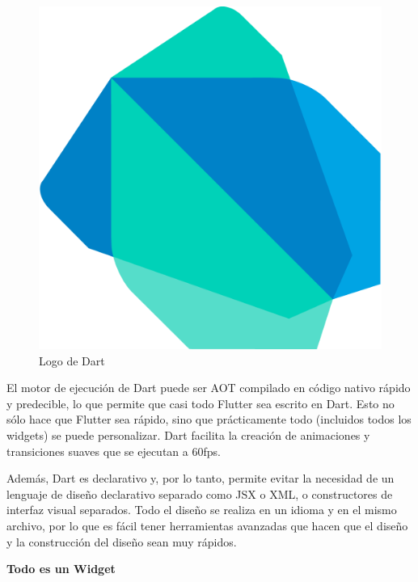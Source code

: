 \begin{figure}[!htb]
    \centering
    \includegraphics[scale=0.1]{TT/img/analisis/dartlogo.png}
    \caption{Logo de Dart}
    \label{graphic:DartLogo}    
\end{figure}

El motor de ejecución de Dart puede ser \acrfull{AOT} compilado en código nativo rápido y predecible, lo que permite que casi todo Flutter sea escrito en Dart. Esto no sólo hace que Flutter sea rápido, sino que prácticamente todo (incluidos todos los widgets) se puede personalizar. Dart facilita la creación de animaciones y transiciones suaves que se ejecutan a 60fps.

Además, Dart es declarativo y, por lo tanto, permite evitar la necesidad de un lenguaje de diseño declarativo separado como \Gls{JSX} o \Gls{XML}, o constructores de interfaz visual separados. Todo el diseño se realiza en un idioma y en el mismo archivo, por lo que es fácil tener herramientas avanzadas que hacen que el diseño y la construcción del diseño sean muy rápidos.
\newline

\textbf{Todo es un Widget}

